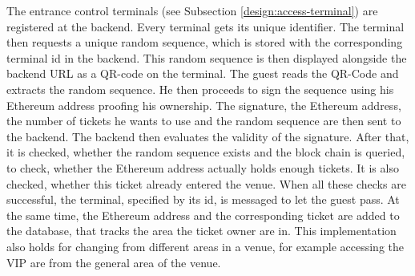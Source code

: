 
The entrance control terminals (see Subsection \ref{design:access-terminal}) are registered at the backend. Every terminal gets its unique identifier. The terminal then requests a unique random sequence, which is stored with the corresponding terminal id in the backend. This random sequence is then displayed alongside the backend URL as a QR-code on the terminal. The guest reads the QR-Code and extracts the random sequence. He then proceeds to sign the sequence using his Ethereum address proofing his ownership. The signature, the Ethereum address, the number of tickets he wants to use and the random sequence are then sent to the backend. The backend then evaluates the validity of the signature. After that, it is checked, whether the random sequence exists and the block chain is queried, to check, whether the Ethereum address actually holds enough tickets. It is also checked, whether this ticket already entered the venue. When all these checks are successful, the terminal, specified by its id, is messaged to let the guest pass. At the same time, the Ethereum address and the corresponding ticket are added to the database, that tracks the area the ticket owner are in. This implementation also holds for changing from different areas in a venue, for example accessing the VIP are from the general area of the venue.






